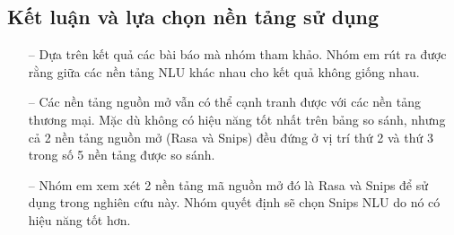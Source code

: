 \subsection{Kết luận và lựa chọn nền tảng sử dụng}

\begin{itemize}
    \item[--] Dựa trên kết quả các bài báo mà nhóm tham khảo. Nhóm em rút ra được rằng giữa các nền tảng NLU khác nhau cho kết quả không giống nhau.
    \item[--] Các nền tảng nguồn mở vẫn có thể cạnh tranh được với các nền tảng thương mại. Mặc dù không có hiệu năng tốt nhất trên bảng so sánh, nhưng cả 2 nền tảng nguồn mở (Rasa và Snips) đều đứng ở vị trí thứ 2 và thứ 3 trong số 5 nền tảng được so sánh.
    \item[--] Nhóm em xem xét 2 nền tảng mã nguồn mở đó là Rasa và Snips để sử dụng trong nghiên cứu này. Nhóm quyết định sẽ chọn Snips NLU do nó có hiệu năng tốt hơn.
\end{itemize}